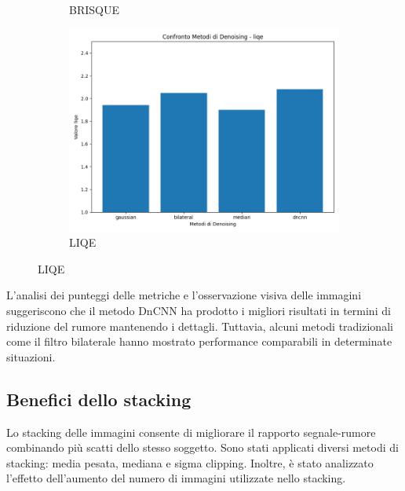 \begin{figure}[H]
\begin{subfigure}[t]{0.45\textwidth}
        \caption{BRISQUE}
        \label{fig:den_brisque}
    \end{subfigure}
    \hfill
    \begin{subfigure}[t]{0.45\textwidth}
        \centering
        \includegraphics[width=\linewidth]{../assets/denoising_comparison_liqe.png}
        \caption{LIQE}
        \label{fig:den_liqe}
    \end{subfigure}
\end{figure}

L'analisi dei punteggi delle metriche e l'osservazione visiva delle immagini suggeriscono che il metodo DnCNN ha prodotto i migliori risultati in termini di riduzione del rumore mantenendo i dettagli. Tuttavia, alcuni metodi tradizionali come il filtro bilaterale hanno mostrato performance comparabili in determinate situazioni.

\subsection{Benefici dello stacking} \label{subsec:analysis_stack}

Lo stacking delle immagini consente di migliorare il rapporto segnale-rumore combinando più scatti dello stesso soggetto. Sono stati applicati diversi metodi di stacking: media pesata, mediana e sigma clipping. Inoltre, è stato analizzato l'effetto dell'aumento del numero di immagini utilizzate nello stacking.



